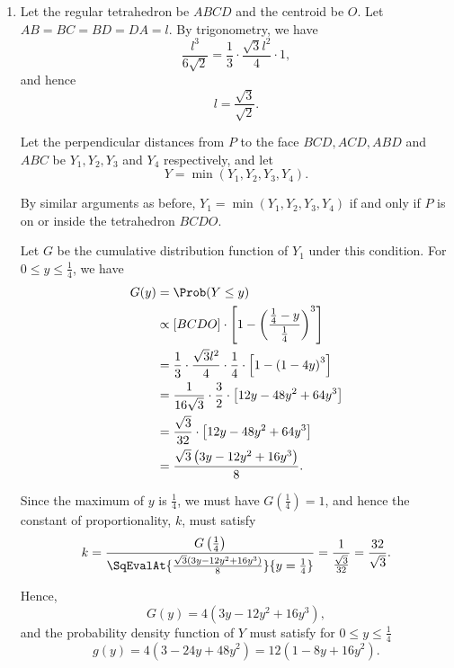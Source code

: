 \begin{enumerate}
    \item Let the regular tetrahedron be \(ABCD\) and the centroid be \(O\). Let \(AB = BC = BD = DA = l\). By trigonometry, we have
          \[
              \frac{l^3}{6\sqrt{2}} = \frac{1}{3} \cdot \frac{\sqrt{3} l^2}{4} \cdot 1,
          \]
          and hence
          \[
              l = \frac{\sqrt{3}}{\sqrt{2}}.
          \]


          Let the perpendicular distances from \(P\) to the face \(BCD, ACD, ABD\) and \(ABC\) be \(Y_1, Y_2, Y_3\) and \(Y_4\) respectively, and let
          \[
              Y = \min(Y_1, Y_2, Y_3, Y_4).
          \]

          By similar arguments as before, \(Y_1 = \min(Y_1, Y_2, Y_3, Y_4)\) if and only if \(P\) is on or inside the tetrahedron \(BCDO\).

          Let \(G\) be the cumulative distribution function of \(Y_1\) under this condition. For \(0 \leq y \leq \frac{1}{4}\), we have
          \begin{align*}
              G(y) & = \Prob(Y \leq y)                                                                                         \\
                   & \propto [BCDO] \cdot \left[1 - \left(\frac{\frac{1}{4} - y}{\frac{1}{4}}\right)^3\right]                  \\
                   & = \frac{1}{3} \cdot \frac{\sqrt{3} l^2}{4} \cdot \frac{1}{4} \cdot \left[1 - \left(1 - 4y\right)^3\right] \\
                   & = \frac{1}{16\sqrt{3}}  \cdot \frac{3}{2} \cdot \left[12y - 48y^2 + 64y^3\right]                          \\
                   & = \frac{\sqrt{3}}{32} \cdot \left[12y - 48y^2 + 64y^3\right]                                              \\
                   & = \frac{\sqrt{3} \left(3y - 12y^2 + 16y^3\right)}{8}.
          \end{align*}

          Since the maximum of \(y\) is \(\frac{1}{4}\), we must have \(G\left(\frac{1}{4}\right) = 1\), and hence the constant of proportionality, \(k\), must satisfy
          \[
              k = \frac{G\left(\frac{1}{4}\right)}{\SqEvalAt{\frac{\sqrt{3} \left(3y - 12y^2 + 16y^3\right)}{8}}{y = \frac{1}{4}}} = \frac{1}{\frac{\sqrt{3}}{32}} = \frac{32}{\sqrt{3}}.
          \]

          Hence,
          \[
              G(y) = 4 \left(3y - 12y^2 + 16y^3\right),
          \]
          and the probability density function of \(Y\) must satisfy for \(0 \leq y \leq \frac{1}{4}\)
          \[
              g(y) = 4 \left(3 - 24y + 48y^2 \right) = 12 \left(1 - 8y + 16y^2\right).
          \]


\end{enumerate}
